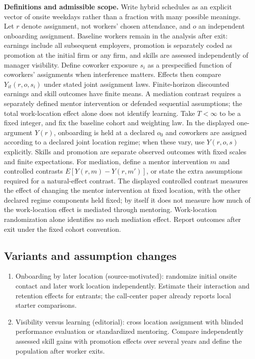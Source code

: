 \documentclass[11pt,a4paper]{article}
\begin{document}
\textbf{Definitions and admissible scope.} Write hybrid schedules as an explicit vector of onsite weekdays rather than a fraction with many possible meanings. Let \(r\) denote assignment, not workers' chosen attendance, and \(o\) an independent onboarding assignment. Baseline workers remain in the analysis after exit: earnings include all subsequent employers, promotion is separately coded as promotion at the initial firm or any firm, and skills are assessed independently of manager visibility. Define coworker exposure \(s_i\) as a prespecified function of coworkers' assignments when interference matters. Effects then compare \(Y_{it}(r,o,s_i)\) under stated joint assignment laws. Finite-horizon discounted earnings and skill outcomes have finite means. A mediation contrast requires a separately defined mentor intervention or defended sequential assumptions; the total work-location effect alone does not identify learning. Take \(T<\infty\) to be a fixed integer, and fix the baseline cohort and weighting law. In the displayed one-argument \(Y(r)\), onboarding is held at a declared \(o_0\) and coworkers are assigned according to a declared joint location regime; when these vary, use \(Y(r,o,s)\) explicitly. Skills and promotion are separate observed outcomes with fixed scales and finite expectations. For mediation, define a mentor intervention \(m\) and controlled contrasts \(E[Y(r,m)-Y(r,m')]\), or state the extra assumptions required for a natural-effect contrast. The displayed controlled contrast measures the effect of changing the mentor intervention at fixed location, with the other declared regime components held fixed; by itself it does not measure how much of the work-location effect is mediated through mentoring. Work-location randomization alone identifies no such mediation effect. Report outcomes after exit under the fixed cohort convention.
\subsection*{Variants and assumption changes}
\begin{enumerate}
\item Onboarding by later location (source-motivated): randomize initial onsite contact and later work location independently. Estimate their interaction and retention effects for entrants; the call-center paper already reports local starter comparisons.
\item Visibility versus learning (editorial): cross location assignment with blinded performance evaluation or standardized mentoring. Compare independently assessed skill gains with promotion effects over several years and define the population after worker exits.
\end{enumerate}
\end{document}
